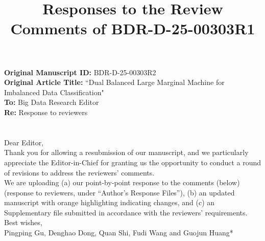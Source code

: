 \documentclass[journal,12pn, onecolumn]{IEEEtran}
\begin{document}

\title{Responses to the Review Comments of BDR-D-25-00303R1}
\maketitle

\textbf{Original Manuscript ID: }BDR-D-25-00303R2 \\


\textbf{Original Article Title: }``Dual Balanced Large Marginal Machine for Imbalanced Data Classification" \\

\textbf{To: }Big Data Research Editor\\

\textbf{Re: }Response to reviewers\\

\section*{}
{
Dear Editor, \\

Thank you for allowing a resubmission of our manuscript, and we particularly appreciate the Editor-in-Chief for granting us the opportunity to conduct a round of revisions to address the reviewers’ comments.\\

We are uploading (a) our point-by-point response to the comments (below) (response to reviewers, under “Author’s Response Files”), (b) an updated manuscript with orange highlighting indicating changes, and (c) an Supplementary file submitted in accordance with the reviewers’ requirements.\\

Best wishes,\\

Pingping Gu, Denghao Dong, Quan Shi, Fudi Wang and Guojun Huang*}\\
\end{document}
